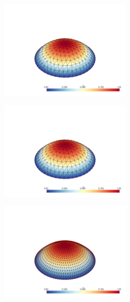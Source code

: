 \documentclass[
  11pt,
]{article}
\let\origfigure\figure
\let\endorigfigure\endfigure
\renewenvironment{figure}[1][2] {
    \expandafter\origfigure\expandafter[H]
} {
    \endorigfigure
}
\begin{document}
\begin{figure}
\centering
\includegraphics[width=0.5\textwidth,height=\textheight]{../img/mesh2-gauss13.png}
\caption{Finite element solution for problem 1 over mesh number 2 and
order-13 numerical integration.}
\end{figure}

\begin{figure}
\centering
\includegraphics[width=0.5\textwidth,height=\textheight]{../img/mesh2-gauss19.png}
\caption{Finite element solution for problem 1 over mesh number 2 and
order-19 numerical integration.}
\end{figure}

\begin{figure}
\centering
\includegraphics[width=0.5\textwidth,height=\textheight]{../img/mesh3-gauss02.png}
\caption{Finite element solution for problem 1 over mesh number 3 and
order-2 numerical integration.}
\end{figure}
\end{document}
